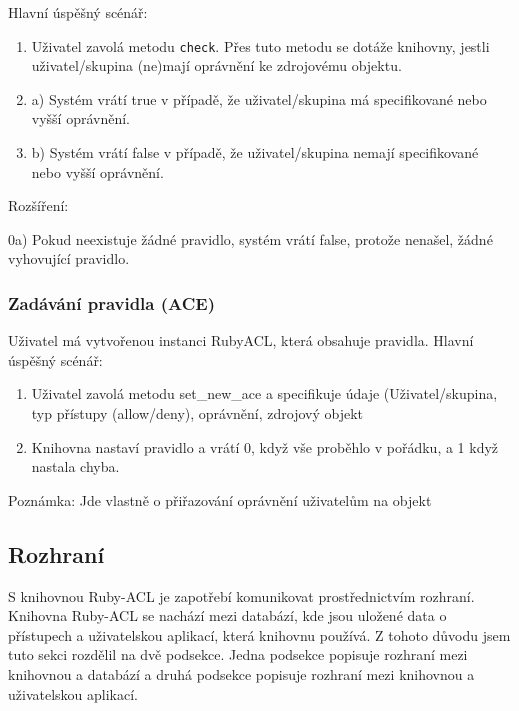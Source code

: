 Hlavní úspěšný scénář:
\begin{enumerate}
\item Uživatel zavolá metodu \verb|check|. Přes tuto metodu se dotáže knihovny, jestli uživatel/skupina (ne)mají oprávnění ke zdrojovému objektu.
\item a) Systém vrátí true v případě, že uživatel/skupina má specifikované nebo vyšší oprávnění.
\item b) Systém vrátí false v případě, že uživatel/skupina nemají specifikované nebo vyšší oprávnění.
\end{enumerate}
Rozšíření:

0a) Pokud neexistuje žádné pravidlo, systém vrátí false, protože nenašel, žádné vyhovující pravidlo.


\subsubsection{Zadávání pravidla (ACE)}
Uživatel má vytvořenou instanci RubyACL, která obsahuje pravidla.
Hlavní úspěšný scénář:
\begin{enumerate}
\item Uživatel zavolá metodu set\_new\_ace a specifikuje údaje (Uživatel/skupina, typ přístupy (allow/deny), oprávnění, zdrojový objekt
\item Knihovna nastaví pravidlo a vrátí 0, když vše proběhlo v pořádku, a 1 když nastala chyba.
\end{enumerate}
Poznámka: Jde vlastně o přiřazování oprávnění uživatelům na objekt


\subsection{Rozhraní}
S knihovnou Ruby-ACL je zapotřebí komunikovat prostřednictvím rozhraní. Knihovna Ruby-ACL se nachází mezi databází, kde jsou uložené data o přístupech a uživatelskou aplikací, která knihovnu používá. Z tohoto důvodu jsem tuto sekci rozdělil na dvě podsekce. Jedna podsekce popisuje rozhraní mezi knihovnou a databází a druhá podsekce popisuje rozhraní mezi knihovnou a uživatelskou aplikací. 


